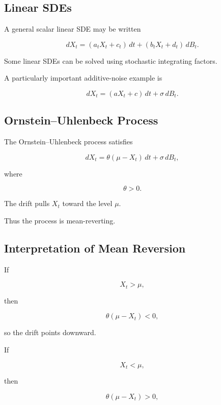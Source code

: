 \subsection{Linear SDEs}
\label{subsec:linear-sdes}

A general scalar linear SDE may be written

\[
\boxed{
dX_t
=
(a_tX_t+c_t)\,dt
+
(b_tX_t+d_t)\,dB_t.
}
\]

Some linear SDEs can be solved using stochastic integrating factors.

A particularly important additive-noise example is

\[
\boxed{
dX_t
=
(aX_t+c)\,dt
+
\sigma\,dB_t.
}
\]

\subsection{Ornstein--Uhlenbeck Process}
\label{subsec:ornstein-uhlenbeck-process}

The Ornstein--Uhlenbeck process satisfies

\[
\boxed{
dX_t
=
\theta(\mu-X_t)\,dt
+
\sigma\,dB_t,
}
\]

where

\[
\theta>0.
\]

The drift pulls \(X_t\) toward the level \(\mu\).

Thus the process is mean-reverting.

\subsection{Interpretation of Mean Reversion}
\label{subsec:mean-reversion-ou}

If

\[
X_t>\mu,
\]

then

\[
\theta(\mu-X_t)<0,
\]

so the drift points downward.

If

\[
X_t<\mu,
\]

then

\[
\theta(\mu-X_t)>0,
\]

